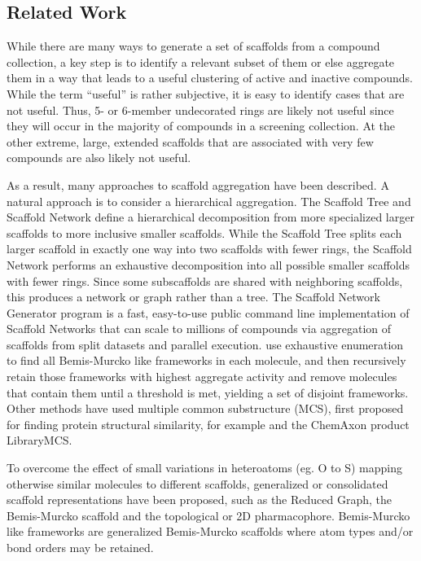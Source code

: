 \documentclass[journal=jacsat,manuscript=article]{achemso}
\begin{document}
\subsection{Related Work}
While there are many ways to generate a set of scaffolds from a
compound collection, a key step is to identify a
relevant subset of them or else aggregate them in a way that leads to a useful
clustering of active and inactive compounds. While the term ``useful'' is rather
subjective, it is easy to identify cases that are not useful. Thus, 5- or
6-member undecorated rings are likely not useful since they will occur in the
majority of compounds in a screening collection. At the other extreme, large,
extended scaffolds that are associated with very few compounds are also likely
not useful.

As a result, many approaches to scaffold aggregation have been described. A
natural approach is to consider a hierarchical aggregation. The Scaffold
Tree\cite{Ertl2011ScaffoldTree} and Scaffold Network\cite{Varin2011ScafNet}
define a hierarchical decomposition from more specialized larger scaffolds to
more inclusive smaller scaffolds. While the Scaffold Tree splits each larger
scaffold in exactly one way into two scaffolds with fewer rings, the Scaffold
Network performs an exhaustive decomposition into all possible smaller scaffolds
with fewer rings.  Since some subscaffolds are shared with neighboring
scaffolds, this produces a network or graph rather than a tree. The Scaffold
Network Generator program\cite{Matlock2013SNG} is a fast, easy-to-use public
command line implementation of Scaffold Networks that can scale to millions of
compounds via aggregation of scaffolds from split datasets and parallel
execution.  \citeauthor{Harper2004DDclus} use exhaustive enumeration to find all
Bemis-Murcko like frameworks in each molecule, and then recursively retain those
frameworks with highest aggregate activity and remove molecules that contain
them until a threshold is met, yielding a set of disjoint frameworks.  Other
methods have used multiple common substructure (MCS), first proposed for finding
protein structural similarity\cite{Koch1997MCSprot}, for example
\citeauthor{Quintus2009MCS} and the ChemAxon product LibraryMCS. 

To overcome the effect of small variations in heteroatoms (eg. O to S) mapping
otherwise similar molecules to different scaffolds, generalized or consolidated
scaffold representations have been proposed, such as the Reduced
Graph\cite{Barker2003RG}, the Bemis-Murcko scaffold\cite{BemisMurcko1996} and
the topological or 2D pharmacophore\cite{Schneider1999ScafHopTP}. Bemis-Murcko
like frameworks \cite{Harper2004DDclus} are generalized Bemis-Murcko scaffolds
where atom types and/or bond orders may be retained.
\end{document}
